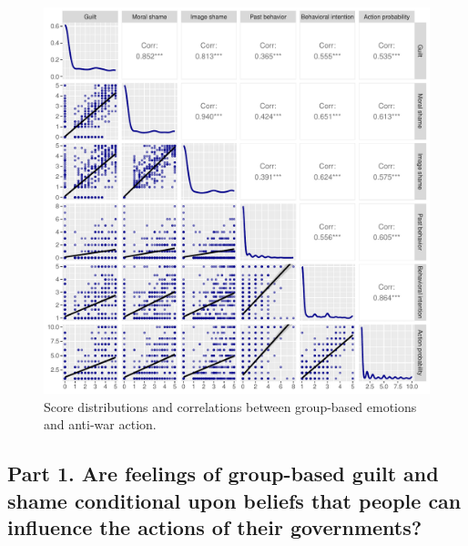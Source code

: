 \documentclass[
]{article}
\begin{document}
\begin{figure}

{\centering \includegraphics{outputs/corplot} 

}

\caption{Score distributions and correlations between group-based emotions and anti-war action.}\label{fig:corplots}
\end{figure}

\allsectionsfont{\raggedright}

\subsection*{Part 1. Are feelings of group-based guilt and shame conditional upon beliefs that people can influence the actions of their governments?}\label{part-1.-are-feelings-of-group-based-guilt-and-shame-conditional-upon-beliefs-that-people-can-influence-the-actions-of-their-governments}
\end{document}
